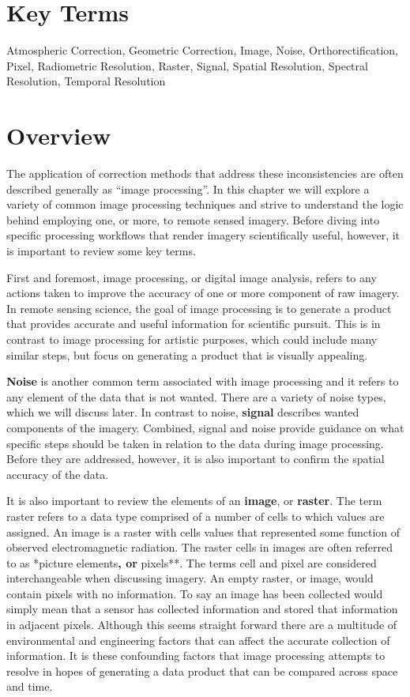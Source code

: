 \documentclass[
]{book}
\begin{document}
\section*{Key Terms}\label{key-terms-10}

Atmospheric Correction, Geometric Correction, Image, Noise, Orthorectification, Pixel, Radiometric Resolution, Raster, Signal, Spatial Resolution, Spectral Resolution, Temporal Resolution

\section{Overview}\label{overview}

The application of correction methods that address these inconsistencies are often described generally as ``image processing''. In this chapter we will explore a variety of common image processing techniques and strive to understand the logic behind employing one, or more, to remote sensed imagery. Before diving into specific processing workflows that render imagery scientifically useful, however, it is important to review some key terms.

First and foremost, image processing, or digital image analysis, refers to any actions taken to improve the accuracy of one or more component of raw imagery. In remote sensing science, the goal of image processing is to generate a product that provides accurate and useful information for scientific pursuit. This is in contrast to image processing for artistic purposes, which could include many similar steps, but focus on generating a product that is visually appealing.

\textbf{Noise} is another common term associated with image processing and it refers to any element of the data that is not wanted. There are a variety of noise types, which we will discuss later. In contrast to noise, \textbf{signal} describes wanted components of the imagery. Combined, signal and noise provide guidance on what specific steps should be taken in relation to the data during image processing. Before they are addressed, however, it is also important to confirm the spatial accuracy of the data.

It is also important to review the elements of an \textbf{image}, or \textbf{raster}. The term raster refers to a data type comprised of a number of cells to which values are assigned. An image is a raster with cells values that represented some function of observed electromagnetic radiation. The raster cells in images are often referred to as *picture elements\textbf{, or }pixels**. The terms cell and pixel are considered interchangeable when discussing imagery. An empty raster, or image, would contain pixels with no information. To say an image has been collected would simply mean that a sensor has collected information and stored that information in adjacent pixels. Although this seems straight forward there are a multitude of environmental and engineering factors that can affect the accurate collection of information. It is these confounding factors that image processing attempts to resolve in hopes of generating a data product that can be compared across space and time.
\end{document}
